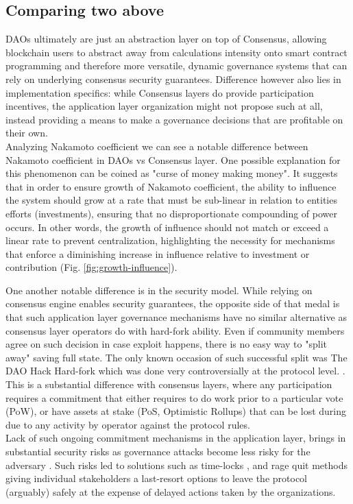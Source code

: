\documentclass{article}
\begin{document}
\begin{CJK}{UTF8}{gbsn}
\begin{multicols}{2}
\subsection{Comparing two above}
DAOs ultimately are just an abstraction layer on top of Consensus, allowing blockchain users to abstract away from calculations intensity onto smart contract programming and therefore more versatile, dynamic governance systems that can rely on underlying consensus security guarantees. Difference however also lies in implementation specifics: while Consensus layers do provide participation incentives, the application layer organization might not propose such at all, instead providing a means to make a governance decisions that are profitable on their own. \\ Analyzing  Nakamoto coefficient we can see a notable difference between Nakamoto coefficient in DAOs vs Consensus layer. One possible explanation for this phenomenon can be coined as "curse of money making money". It suggests that in order to ensure growth of Nakamoto coefficient, the ability to influence the system should grow at a rate that must be sub-linear in relation to entities efforts (investments), ensuring that no disproportionate compounding of power occurs. In other words, the growth of influence should not match or exceed a linear rate to prevent centralization, highlighting the necessity for mechanisms that enforce a diminishing increase in influence relative to investment or contribution (Fig. \ref*{fig:growth-influence}).

One another notable difference is in the security model. While relying on consensus engine enables security guarantees, the opposite side of that medal is that such application layer governance mechanisms have no similar alternative as consensus layer operators do with hard-fork ability. Even if community members agree on such decision in case exploit happens, there is no easy way to "split away" saving full state. The only known occasion of such successful split was The DAO Hack Hard-fork which was done very controversially at the protocol level.  \cite{Liu2021}.
This is a substantial difference with consensus layers, where any participation requires a commitment that either requires to do work prior to a particular vote (PoW), or have assets at stake (PoS, Optimistic Rollups) that can be lost during due to any activity by operator against the protocol rules.\\
Lack of such ongoing commitment mechanisms in the application layer, brings in substantial security risks as governance attacks become less risky for the adversary \cite{AragonBlog}\cite{rhizoo2023}. Such risks led to solutions such as time-locks \cite{Jack2021}, and rage quit \cite{Ameen2019} methods giving individual stakeholders a last-resort options to leave the protocol (arguably) safely at the expense of delayed actions taken by the organizations.


\end{multicols}
\end{CJK}
\end{document}
